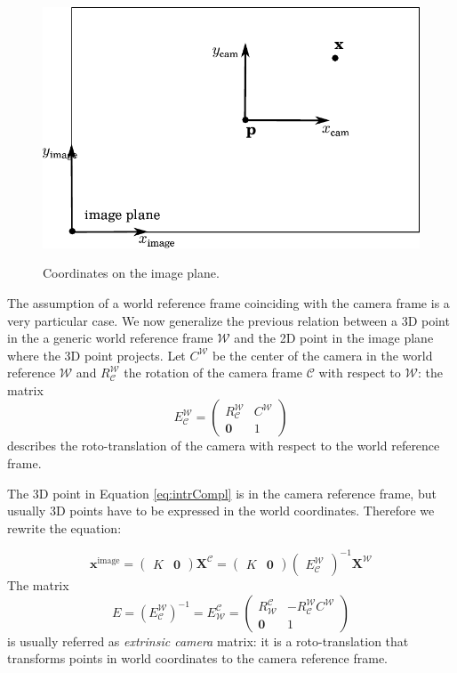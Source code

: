 \begin{figure}[t]
\centering
  \includegraphics[width=0.8\columnwidth]{./img/ch-camera/camera02}\\
 \caption{Coordinates on the image plane.}
 \label{fig:centercamera}
\end{figure}
The assumption of a world reference frame coinciding with the camera frame is a very particular case. We now generalize the previous relation between a 3D point in the a generic world reference frame $\mathcal{W}$ and the 2D point in the image plane where the 3D point projects.
Let $C^\mathcal{W}$ be the center of the camera in the world reference $\mathcal{W}$ and  $R_\mathcal{C}^\mathcal{W}$ the rotation of the camera frame $\mathcal{C}$ with respect to $\mathcal{W}$: the matrix 
\begin{equation}
E_\mathcal{C}^\mathcal{W} = 
\begin{pmatrix}
R_\mathcal{C}^\mathcal{W} &C^\mathcal{W}\\
\mathbf{0}&1
 \end{pmatrix}   
\end{equation}
 describes the roto-translation of the camera with respect to the world reference frame.

The 3D point in Equation \ref{eq:intrCompl} is in the camera reference frame, but usually 3D points have to be expressed in the world coordinates. Therefore we rewrite the equation:


\begin{equation}
 \mathbf{x}^{\text{image}} =
\begin{pmatrix}
 K &\mathbf{0}
 \end{pmatrix} 
 \mathbf{X}^\mathcal{C}
 = 
\begin{pmatrix}
 K &\mathbf{0}
 \end{pmatrix} 
\begin{pmatrix}
 E_\mathcal{C}^\mathcal{W}
 \end{pmatrix}^{-1}
 \mathbf{X}^\mathcal{W}
\end{equation}
The matrix 
\begin{equation}
  E = (E_\mathcal{C}^\mathcal{W})^{-1} = E_{\mathcal{W}}^{\mathcal{C}} = 
\begin{pmatrix}
R_\mathcal{W}^\mathcal{C} & - R_\mathcal{C}^\mathcal{W} C^\mathcal{W}\\
\mathbf{0}&1
 \end{pmatrix}
\end{equation}
is usually referred as \emph{extrinsic camera} matrix: it is a roto-translation that transforms points in world coordinates to the camera reference frame.

